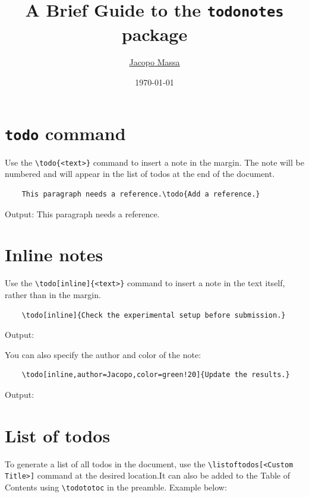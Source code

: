 \documentclass{article}
\title{A Brief Guide to the \texttt{todonotes} package}
\date{\today}
\author{\href{https://pages.di.unipi.it/massa}{Jacopo Massa}}
\begin{document}
\maketitle

\section*{\texttt{todo} command}

Use the \verb|\todo{<text>}| command to insert a note in the margin. The note will be numbered and will appear in the list of todos at the end of the document.
\begin{Verbatim}
	This paragraph needs a reference.\todo{Add a reference.}
\end{Verbatim}
Output:
This paragraph needs a reference.

\section*{Inline notes}

Use the \verb|\todo[inline]{<text>}| command to insert a note in the text itself, rather than in the margin.
\begin{Verbatim}
	\todo[inline]{Check the experimental setup before submission.}
\end{Verbatim}
Output:

\vspace{0.5cm}\noindent You can also specify the author and color of the note:
\begin{Verbatim}
	\todo[inline,author=Jacopo,color=green!20]{Update the results.}
\end{Verbatim}
Output:

\section*{List of todos}

To generate a list of all todos in the document, use the \verb|\listoftodos[<Custom Title>]| command at the desired location.It can also be added to the Table of Contents using \verb|\todototoc| in the preamble. Example below:

{
	\hypersetup{hidelinks}
	\listoftodos[My Todos]
}
\end{document}
